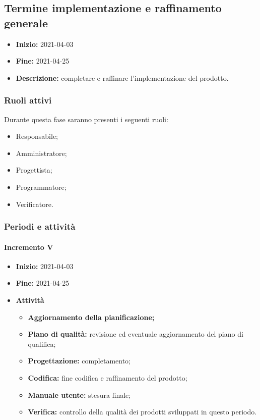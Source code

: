 

\subsection{Termine implementazione e raffinamento generale} \label{_pianificazioneTermineImplementazione}
\begin{itemize}
    \item [] \textbf{Inizio:} 2021-04-03
    \item [] \textbf{Fine:} 2021-04-25
    \item [] \textbf{Descrizione:} completare e raffinare l'implementazione del prodotto.
\end{itemize}

\subsubsection{Ruoli attivi}
Durante questa fase saranno presenti i seguenti ruoli:
\begin{itemize}
    \item Responsabile;
    \item Amministratore;
    \item Progettista;
    \item Programmatore;
    \item Verificatore.
\end{itemize}

\subsubsection{Periodi e attività}

\paragraph[Incremento V]{Incremento V}
\begin{itemize}
    \item [] \textbf{Inizio:} 2021-04-03
    \item [] \textbf{Fine:} 2021-04-25
    \item [] \textbf{Attività}
          \begin{itemize}
              \item \textbf{Aggiornamento della pianificazione;}
              \item \textbf{Piano di qualità:} revisione ed eventuale aggiornamento del piano di qualifica;
              \item \textbf{Progettazione:} completamento;
              \item \textbf{Codifica:} fine codifica e raffinamento del prodotto;
              \item \textbf{Manuale utente:} stesura finale;
              \item \textbf{Verifica:} controllo della qualità dei prodotti sviluppati in questo periodo.
          \end{itemize}
\end{itemize}

